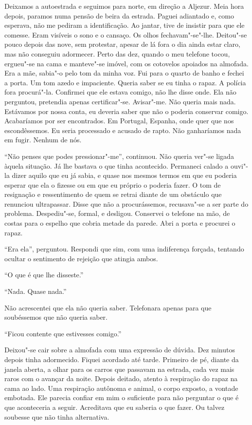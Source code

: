Deixamos a autoestrada e seguimos para norte, em direção a Aljezur.
Meia hora depois, paramos numa pensão de beira da estrada. Paguei
adiantado e, como esperava, não me pediram a identificação. Ao jantar,
tive de insistir para que ele comesse. Eram visíveis o sono e o cansaço.
Os olhos fechavam"-se"-lhe. Deitou"-se pouco depois das nove, sem
protestar, apesar de lá fora o dia ainda estar claro, mas não conseguiu
adormecer. Perto das dez, quando o meu telefone tocou, ergueu"-se na
cama e manteve"-se imóvel, com os cotovelos apoiados na almofada. Era a
mãe, sabia"-o pelo tom da minha voz. Fui para o quarto de banho e fechei
a porta. Um tom azedo e impaciente. Queria saber se eu tinha o rapaz. A
polícia fora procurá"-la. Confirmei que ele estava comigo, não lhe disse
onde. Ela não perguntou, pretendia apenas certificar"-se. Avisar"-me.
Não queria mais nada. Estávamos por nossa conta, eu deveria saber que
não o poderia conservar comigo. Acabaríamos por ser encontrados. Em
Portugal, Espanha, onde quer que nos escondêssemos. Eu seria processado
e acusado de rapto. Não ganharíamos nada em fugir. Nenhum de nós.

``Não penses que podes pressionar"-me'',
continuou. Não queria ver"-se ligada àquela situação. Já lhe bastava o
que tinha acontecido. Permaneci calado a ouvi"-la dizer aquilo que eu já
sabia, e quase nos mesmos termos em que eu poderia esperar que ela o
fizesse ou em que eu próprio o poderia fazer. O tom de resignação e
ressentimento de quem se retrai diante de um obstáculo que renunciou
ultrapassar. Disse que não a procurássemos, recusava"-se a ser parte do
problema. Despediu"-se, formal, e desligou. Conservei o telefone na mão,
de costas para o espelho que cobria metade da parede. Abri a porta e
procurei o rapaz.

``Era ela'',
perguntou. Respondi que sim, com uma indiferença forçada, tentando
ocultar o sentimento de rejeição que atingia ambos.

``O que é que lhe disseste.''

``Nada. Quase nada.''

Não acrescentei que ela não queria saber. Telefonara apenas para que
soubéssemos que não queria saber.

``Ficou contente que estivesses comigo.''

Deixou"-se cair sobre a almofada com uma expressão de dúvida. Dez
minutos depois tinha adormecido. Fiquei acordado até tarde. Primeiro de
pé, diante da janela aberta, a olhar para os carros que passavam na
estrada, cada vez mais raros com o avançar da noite. Depois deitado,
atento à respiração do rapaz na cama ao lado. Uma respiração autônoma e
animal, o corpo exposto, a vontade embotada. Ele parecia confiar em mim
o suficiente para não perguntar o que é que aconteceria a seguir.
Acreditava que eu saberia o que fazer. Ou talvez soubesse que não tinha
alternativa.

